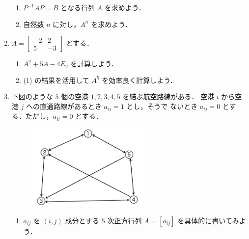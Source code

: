 \documentclass[11pt, uplatex, dvipdfmx]{jsarticle}
\begin{document}
\begin{enumerate}
  \vspace{1zh}
  
  \begin{enumerate}[(1)]
    \setlength{\itemsep}{1ex}
    
  \item $P^{-1}AP=B$ となる行列 $A$ を求めよう．

  \item 自然数 $n$ に対し，$A^n$ を求めよう．
  \end{enumerate}

\item $A=\left[
    \begin{array}{rr}
      -2 & 2\\
      5 & -3
    \end{array}
  \right]$ とする．

  \vspace{1zh}

  \begin{enumerate}[(1)]
    \setlength{\itemsep}{1ex}
    
  \item $A^2+5A-4E_2$ を計算しよう．

  \item (1) の結果を活用して $A^5$ を効率良く計算しよう．
  \end{enumerate}
  
\item 下図のような $5$ 個の空港 $1, 2, 3, 4 ,5$ を結ぶ航空路線がある．
  空港 $i$ から空港 $j$ への直通路線があるとき $a_{ij}=1$ とし，そうで
  ないとき $a_{ij}=0$ とする．ただし，$a_{ii}=0$ とする．
  \begin{figure}[h]
    \centering
    \includegraphics[width=6cm]{./pictures/routes.pdf}
  \end{figure}

  \begin{enumerate}[(1)]
    \setlength{\itemsep}{1ex}
    
  \item $a_{ij}$ を $(i,j)$ 成分とする $5$ 次正方行列 $A=\left[ a_{ij}\right]$ を具体的に書いてみよう．


\end{enumerate}
\end{enumerate}
\end{document}

